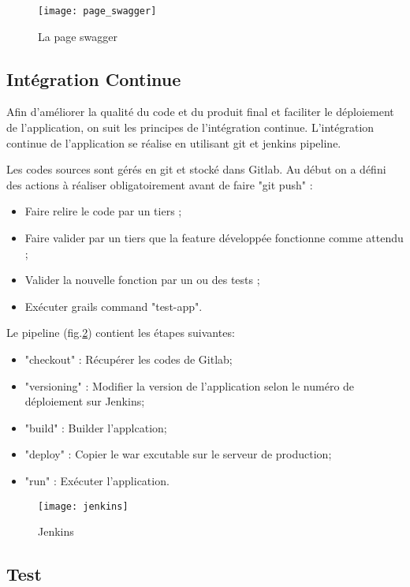 \begin{figure}[ht]
 \centering
 \texttt{[image: page\_swagger]}
 \caption{La page swagger}
 \label{fig:page_swagger}
\end{figure}

\subsection{Intégration Continue}
Afin d'améliorer la qualité du code et du produit final et faciliter le déploiement de l'application,
on suit les principes de l'intégration continue.
L'intégration continue de l'application se réalise en utilisant git et jenkins pipeline.

Les codes sources sont gérés en git et stocké dans Gitlab.
Au début on a défini des actions à réaliser obligatoirement avant de faire "git push" :
\begin{itemize}
 \item Faire relire le code par un tiers ;
 \item Faire valider par un tiers que la feature développée fonctionne comme attendu ;
 \item Valider la nouvelle fonction par un ou des tests ;
 \item Exécuter grails command "test-app".
\end{itemize}

\begin{minipage}{\textwidth}
  Le pipeline (fig.\ref{fig:jenkins}) contient les étapes suivantes:
  \begin{itemize}
   \item "checkout" : Récupérer les codes de Gitlab;
   \item "versioning" : Modifier la version de l'application selon le numéro de déploiement sur Jenkins;
   \item "build" : Builder l'applcation;
   \item "deploy" : Copier le war excutable sur le serveur de production;
   \item "run" : Exécuter l'application.
  \end{itemize}
\end{minipage}

\begin{figure}[ht]
 \centering
 \texttt{[image: jenkins]}
 \caption{Jenkins}
 \label{fig:jenkins}
\end{figure}

\subsection{Test}


